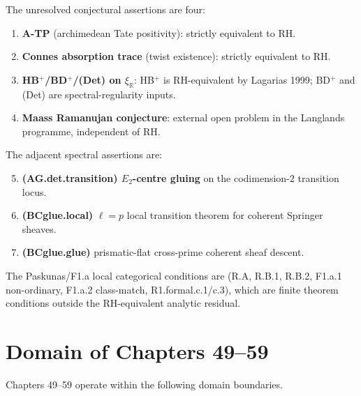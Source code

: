 The unresolved conjectural assertions are four:

\begin{enumerate}
\item \textbf{A-TP} (archimedean Tate positivity): strictly
equivalent to RH.
\item \textbf{Connes absorption trace} (twist existence):
strictly equivalent to RH.
\item \textbf{HB\(^{+}\)/BD\(^{+}\)/(Det) on \(\xi_{\mathbb{R}}\)}:
HB\(^{+}\) is RH-equivalent by Lagarias 1999; BD\(^{+}\) and (Det)
are spectral-regularity inputs.
\item \textbf{Maass Ramanujan conjecture}: external open problem
in the Langlands programme, independent of RH.
\end{enumerate}

The adjacent spectral assertions are:

\begin{enumerate}
\setcounter{enumi}{4}
\item \textbf{(AG.det.transition) \(E_{2}\)-centre gluing} on the
codimension-\(2\) transition locus.
\item \textbf{(BCglue.local)} \(\ell=p\) local transition theorem
for coherent Springer sheaves.
\item \textbf{(BCglue.glue)} prismatic-flat cross-prime coherent
sheaf descent.
\end{enumerate}

The Paskunas/F1.a local categorical conditions are (R.A, R.B.1,
R.B.2, F1.a.1 non-ordinary, F1.a.2 class-match, R1.formal.c.1/c.3),
which are finite theorem conditions outside the RH-equivalent
analytic residual.

\section{Domain of Chapters 49--59}
\label{v4-arith:w5-synth:does-not-do}

Chapters 49--59 operate within the following domain boundaries.

